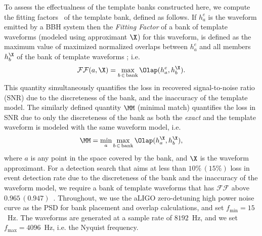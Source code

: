 To assess the effectualness of the template banks constructed here, we compute
the fitting factors~\citep{FittingFactorApostolatos} of the template bank,
defined as follows. If $h^e_a$ is the waveform emitted by a BBH system then the \textit{Fitting
Factor} of a bank of template waveforms (modeled using approximant $\X$) for
this waveform, is defined as the maximum value of maximized normalized
overlaps between $h^e_a$ and all members $h^{\X}_b$ of the bank of template
waveforms \citep{FittingFactorApostolatos}; i.e.
\begin{equation}\label{eq:defFF}
\mathcal{FF}(a,\X) = \underset{b\, \in\, \mathrm{bank}}{\textrm{max}}\,\Olap(h^e_a,h^{\X}_b).
\end{equation}
This quantity simultaneously quantifies the loss in recovered signal-to-noise
ratio (SNR) due to the discreteness of the bank, and the inaccuracy of the
template model. The similarly defined quantity $\MM$ (minimal match)
quantifies the loss in SNR due to only the discreteness of the bank as both
the \textit{exact} and the template waveform is modeled with the same waveform
model, i.e.
\begin{equation}
\MM = \underset{a}{\textrm{min}}\,\underset{b\, \in\, \mathrm{bank}}{\textrm{max}}\,\Olap(h^{\X}_a,h^{\X}_b),
\end{equation}
where $a$ is any point in the space covered by the bank, and $\X$ is the
waveform approximant. For a detection search that aims at less than $10\%\,
(15\%)$ loss in event detection rate due to the discreteness of the bank and
the inaccuracy of the waveform model, we require a bank of template waveforms
that has $\mathcal{FF}$ above $0.965\,
(0.947)$~\citep{WaveformAccuracy2008,WaveformAccuracy2010,CompTemplates2009}.
Throughout, we use the aLIGO zero-detuning high power noise curve as the
PSD for bank placement and overlap calculations, and set $f_\mathrm{min} =
15$~Hz. The waveforms are generated at a sample rate of $8192$~Hz, and we set 
$f_\mathrm{max} = 4096$~Hz, i.e. the Nyquist frequency.

